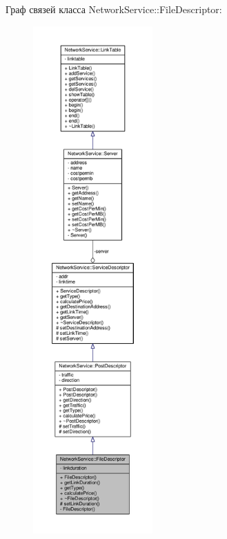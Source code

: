 Граф связей класса Network\+Service\+:\+:File\+Descriptor\+:
\nopagebreak
\begin{figure}[H]
\begin{center}
\leavevmode
\includegraphics[height=550pt]{class_network_service_1_1_file_descriptor__coll__graph}
\end{center}
\end{figure}
